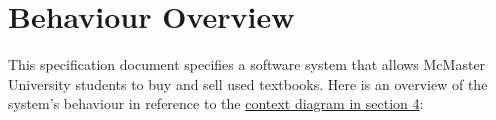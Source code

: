 \documentclass[fullpage]{article}
\begin{document}
\newpage
\section{Behaviour Overview}

\noindent This specification document specifies a software system that allows McMaster University students to buy and sell used textbooks. Here is an overview of the system's behaviour in reference to the \hyperref[sec:context]{context diagram in section 4}:
\end{document}
